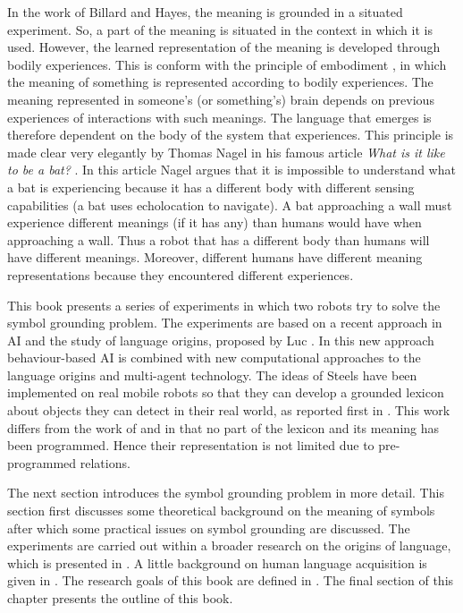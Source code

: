 In the work of Billard and Hayes, the meaning is grounded in a situated experiment. So, a part of the meaning is situated in the context in which it is used. However, the learned representation of the meaning is developed through bodily experiences. This is conform with the principle of {\sc embodiment} \citep{lakoff:1987}, in which the meaning of something is represented according to bodily experiences. The meaning represented in someone's (or something's) brain depends on previous experiences of interactions with such meanings. The language that emerges is therefore dependent on the body of the system that experiences. This principle is made clear very elegantly by Thomas Nagel in his famous article {\em What is it like to be a bat?} \citep{nagel:1974}. In this article Nagel argues that it is impossible to understand what a bat is experiencing because it has a different body with different sensing capabilities (a bat uses echolocation to navigate). A bat approaching a wall must experience different meanings (if it has any) than humans would have when approaching a wall. Thus a robot that has a different body than humans will have different meanings. Moreover, different humans have different meaning representations because they encountered different experiences.

This book presents a series of experiments in which two robots try to solve the symbol grounding problem. The experiments are based on a recent approach in AI and the study of language origins, proposed by Luc \citet{steels:1996a}. In this new approach behaviour-based AI \citep{steelsbrooks:1993} is combined with new computational approaches to the language origins and multi-agent technology. The ideas of Steels have been implemented on real mobile robots so that they can develop a grounded lexicon about objects they can detect in their real world, as reported first in \citealt{steelsvogt:1997}. This work differs from the work of \citet{yancostein} and \citet{billard:1997a} in that no part of the lexicon and its meaning has been programmed. Hence their representation is not limited due to pre-programmed relations.

The next section introduces the symbol grounding problem in more detail. This section first discusses some theoretical background on the meaning of symbols after which some practical issues on symbol grounding are discussed. The experiments are carried out within a broader research on the origins of language, which is presented in . A little background on human language acquisition is given in . The research goals of this book are defined in . The final section of this chapter presents the outline of this book.

